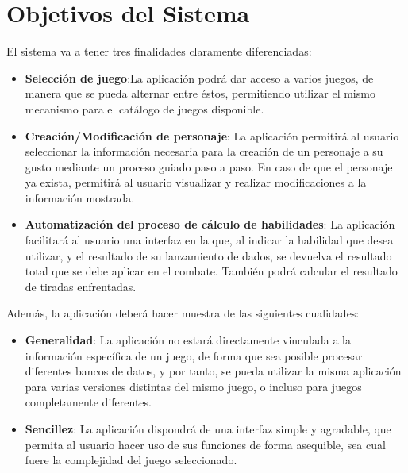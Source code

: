 
\section{Objetivos del Sistema}
El sistema va a tener tres finalidades claramente diferenciadas:
\begin{itemize}

    \item \textbf{Selección de juego}:La aplicación podrá dar 
    acceso a varios juegos, de manera que se pueda alternar 
    entre éstos, permitiendo utilizar el mismo mecanismo para 
    el catálogo de juegos disponible.

    \item \textbf{Creación/Modificación de personaje}: La 
    aplicación permitirá al usuario seleccionar la información
    necesaria para la creación de un personaje a su gusto 
    mediante un proceso guiado paso a paso. En caso de que el 
    personaje ya exista, permitirá al usuario visualizar y realizar 
    modificaciones a la información mostrada.

    \item \textbf{Automatización del proceso de cálculo 
    de habilidades}: La aplicación facilitará al usuario una 
    interfaz en la que, al indicar la habilidad que desea 
    utilizar, y el resultado de su lanzamiento de dados, se 
    devuelva el resultado total que se debe aplicar en el 
    combate. También podrá calcular el resultado de tiradas 
    enfrentadas.

\end{itemize}

Además, la aplicación deberá hacer muestra de las siguientes 
cualidades: 
\begin{itemize}

    \item \textbf{Generalidad}: La aplicación no estará directamente 
    vinculada a la información específica de un juego, de forma que 
    sea posible procesar diferentes bancos de datos, y por tanto, 
    se pueda utilizar la misma aplicación para varias versiones 
    distintas del mismo juego, o incluso para juegos completamente 
    diferentes.

    \item \textbf{Sencillez}: La aplicación dispondrá de una interfaz 
    simple y agradable, que permita al usuario hacer uso de sus 
    funciones de forma asequible, sea cual fuere la complejidad del 
    juego seleccionado.

\end{itemize}
